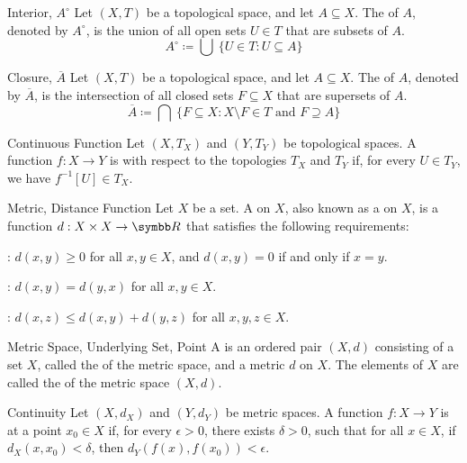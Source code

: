 \documentclass[12pt]{report}
\begin{document}
\begin{dfnbox}{Interior, $A^\circ$}
	Let $(X, T)$ be a topological space, and let $A \subseteq X$. The  of $A$, denoted by $A^\circ$, is the union of all open sets $U \in T$ that are subsets of $A$.
	\[ A^\circ \coloneq \bigcup \ \{ U \in T : U \subseteq A \} \]
\end{dfnbox}

\begin{dfnbox}{Closure, $\overline{A}$}
	Let $(X, T)$ be a topological space, and let $A \subseteq X$. The  of $A$, denoted by $\overline{A}$, is the intersection of all closed sets $F \subseteq X$ that are supersets of $A$.
	\[ \overline{A} \coloneq \bigcap \ \{ F \subseteq X : X \setminus F \in T \text{ and } F \supseteq A \} \]
\end{dfnbox}

\begin{dfnbox}{Continuous Function}
	Let $(X, T_X)$ and $(Y, T_Y)$ be topological spaces. A function $f: X \to Y$ is  with respect to the topologies $T_X$ and $T_Y$ if, for every $U \in T_Y$, we have $f^{-1}[U] \in T_X$.
\end{dfnbox}

\begin{dfnbox}{Metric, Distance Function}
	Let $X$ be a set. A  on $X$, also known as a  on $X$, is a function $d: X \times X \to \R$ that satisfies the following requirements:
	\begin{boxitems}
		\item {}: $d(x, y) \ge 0$ for all $x, y \in X$, and $d(x, y) = 0$ if and only if $x = y$.
		\item {}: $d(x, y) = d(y, x)$ for all $x, y \in X$.
		\item {}: $d(x, z) \le d(x, y) + d(y, z)$ for all $x, y, z \in X$.
	\end{boxitems}
\end{dfnbox}

\begin{dfnbox}{Metric Space, Underlying Set, Point}
	A  is an ordered pair $(X, d)$ consisting of a set $X$, called the  of the metric space, and a metric $d$ on $X$. The elements of $X$ are called the  of the metric space $(X, d)$.
\end{dfnbox}

\begin{dfnbox}{Continuity}
	Let $(X, d_X)$ and $(Y, d_Y)$ be metric spaces. A function $f: X \to Y$ is  at a point $x_0 \in X$ if, for every $\epsilon > 0$, there exists $\delta > 0$, such that for all $x \in X$, if $d_X(x, x_0) < \delta$, then $d_Y(f(x), f(x_0)) < \epsilon$.
\end{dfnbox}
\end{document}
